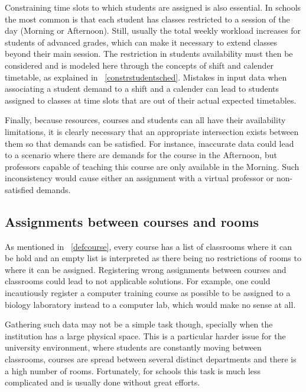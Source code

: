 
Constraining time slots to which students are assigned is also essential. In schools the most common is that each student has classes restricted to a session of the day (Morning or Afternoon). Still, usually the total weekly workload increases for students of advanced grades, which can make it necessary to extend classes beyond their main session. The restriction in students availability must then be considered and is modeled here through the concepts of shift and calender timetable, as explained in ~\ref{constrstudentsched}. Mistakes in input data when associating a student demand to a shift and a calender can lead to students assigned to classes at time slots that are out of their actual expected timetables.

Finally, because resources, courses and students can all have their availability limitations, it is clearly necessary that an appropriate intersection exists between them so that demands can be satisfied. For instance, inaccurate data could lead to a scenario where there are demands for the course  in the Afternoon, but professors capable of teaching this course are only available in the Morning. Such inconsistency would cause either an assignment with a virtual professor or non-satisfied demands.


\subsection{Assignments between courses and rooms}

As mentioned in ~\ref{defcourse}, every course has a list of classrooms where it can be hold and an empty list is interpreted as there being no restrictions of rooms to where it can be assigned. Registering wrong assignments between courses and classrooms could lead to not applicable solutions. For example, one could incautiously register a computer training course as possible to be assigned to a biology laboratory instead to a computer lab, which would make no sense at all.

Gathering such data may not be a simple task though, specially when the institution has a large physical space. This is a particular harder issue for the university environment, where students are constantly moving between classrooms, courses are spread between several distinct departments and there is a high number of rooms. Fortunately, for schools this task is much less complicated and is usually done without great efforts.




